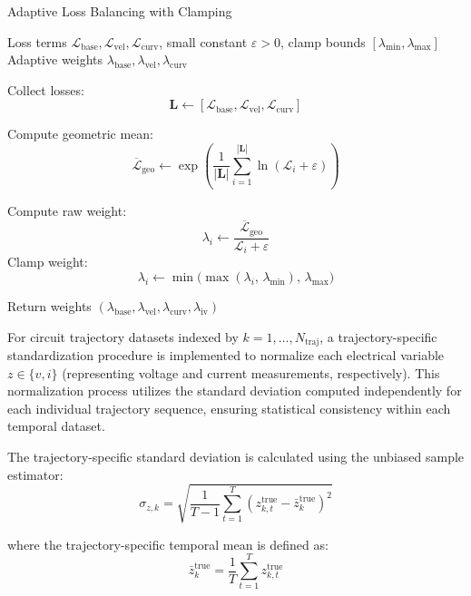 \documentclass[11pt, oneside]{article}
\begin{document}
\begin{algorithm}[H]
    \caption{Adaptive Loss Balancing with Clamping}
    \label{alg:adaptive_loss_balancing}
    \begin{algorithmic}[1]
        \Require Loss terms $\mathcal{L}_{\text{base}}, \mathcal{L}_{\text{vel}}, \mathcal{L}_{\text{curv}}$, small constant $\varepsilon > 0$, clamp bounds $[\lambda_{\min}, \lambda_{\max}]$
        \Ensure Adaptive weights $\lambda_{\text{base}}, \lambda_{\text{vel}}, \lambda_{\text{curv}}$
        \Statex

        \State Collect losses:
        \[
            \mathbf{L} \gets [\mathcal{L}_{\text{base}}, \mathcal{L}_{\text{vel}}, \mathcal{L}_{\text{curv}}]
        \]

        \State Compute geometric mean:
        \[
            \overline{\mathcal{L}}_{\text{geo}} \gets \exp\!\left(\frac{1}{|\mathbf{L}|} \sum_{i=1}^{|\mathbf{L}|} \ln(\mathcal{L}_i + \varepsilon)\right)
        \]

        \State Compute raw weight:
        \[
            \lambda_i \gets \frac{\overline{\mathcal{L}}_{\text{geo}}}{\mathcal{L}_i + \varepsilon}
        \]
        \State Clamp weight:
        \[
            \lambda_i \gets \min\!\big(\max(\lambda_i, \, \lambda_{\min}), \, \lambda_{\max}\big)
        \]
        \EndFor

        \State Return weights $(\lambda_{\text{base}}, \lambda_{\text{vel}}, \lambda_{\text{curv}}, \lambda_{\text{iv}})$
    \end{algorithmic}
\end{algorithm}


For circuit trajectory datasets indexed by $k = 1, \ldots, N_{\text{traj}}$, a trajectory-specific standardization procedure is implemented to normalize each electrical variable $z \in \{v, i\}$ (representing voltage and current measurements, respectively). This normalization process utilizes the standard deviation computed independently for each individual trajectory sequence, ensuring statistical consistency within each temporal dataset.

The trajectory-specific standard deviation is calculated using the unbiased sample estimator:
\begin{equation}
    \sigma_{z,k} = \sqrt{\frac{1}{T-1} \sum_{t=1}^{T} \left(z_{k,t}^{\mathrm{true}} - \bar{z}_k^{\mathrm{true}}\right)^2}
\end{equation}

where the trajectory-specific temporal mean is defined as:
\begin{equation}
    \bar{z}_k^{\mathrm{true}} = \frac{1}{T} \sum_{t=1}^{T} z_{k,t}^{\mathrm{true}}
\end{equation}
\end{document}
